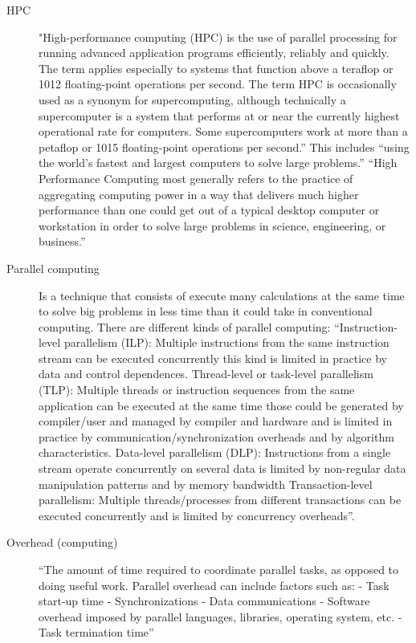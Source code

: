 \documentclass[fleqn,10pt]{SelfArx} %
\begin{document}
\begin{description}
	\item[HPC] 
	"High-performance computing (HPC) is the use of parallel processing for running advanced application programs efficiently, reliably and quickly. The term applies especially to systems that function above a teraflop or 1012 floating-point operations per second. The term HPC is occasionally used as a synonym for supercomputing, although technically a supercomputer is a system that performs at or near the currently highest operational rate for computers. Some supercomputers work at more than a petaflop or 1015 floating-point operations per second.” \cite{hpc_def} This includes “using the world's fastest and largest computers to solve large problems.” \cite{parallel_comp_lawrence_nat_lab}
	“High Performance Computing most generally refers to the practice of aggregating computing power in a way that delivers much higher performance than one could get out of a typical desktop computer or workstation in order to solve large problems in science, engineering, or business.” \cite{hpc}
	
	\item[Parallel computing] 
	Is a technique that consists of execute many calculations at the same time to solve big problems in less time than it could take in conventional computing. There are different kinds of parallel computing:
	“Instruction-level parallelism (ILP): Multiple instructions from the same instruction stream can be executed concurrently this kind is limited in practice by data and control dependences.
	Thread-level or task-level parallelism (TLP): Multiple threads or instruction sequences from the same application can be executed at the same time those could be generated by compiler/user and managed by compiler and hardware and is limited in practice by communication/synchronization overheads and by algorithm characteristics.
	Data-level parallelism (DLP): Instructions from a single stream operate concurrently on several data is limited by non-regular data manipulation patterns and by memory bandwidth 
	Transaction-level parallelism: Multiple threads/processes from different transactions can be executed concurrently and is limited by concurrency overheads”\cite{Parallel Computing}.
	
	\item[Overhead (computing)] “The amount of time required to coordinate parallel tasks, as opposed to doing useful work. Parallel overhead can include factors such as:
	- Task start-up time
	- Synchronizations
	- Data communications
	- Software overhead imposed by parallel languages, libraries, operating system, etc.
	- Task termination time”  \cite{parallel_comp_lawrence_nat_lab}
	
	
\end{description}
\end{document}
